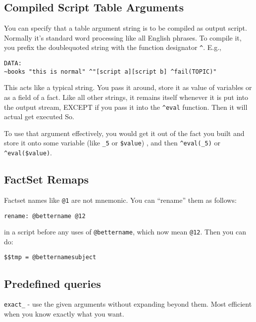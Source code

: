 \documentclass[]{article}
\begin{document}
\subsection{Compiled Script Table
Arguments}\label{compiled-script-table-arguments}

You can specify that a table argument string is to be compiled as output
script. Normally it's standard word processing like all English phrases.
To compile it, you prefix the doublequoted string with the function
designator \texttt{\^{}}. E.g.,

\begin{verbatim}
DATA:
~books "this is normal" ^"[script a][script b] ^fail(TOPIC)"
\end{verbatim}

This acts like a typical string. You pass it around, store it as value
of variables or as a field of a fact. Like all other strings, it remains
itself whenever it is put into the output stream, EXCEPT if you pass it
into the \texttt{\^{}eval} function. Then it will actual get executed
So.

To use that argument effectively, you would get it out of the fact you
built and store it onto some variable (like \texttt{\_5} or
\texttt{\$value}) , and then \texttt{\^{}eval(\_5)} or
\texttt{\^{}eval(\$value)}.

\subsection{FactSet Remaps}\label{factset-remaps}

Factset names like \texttt{@1} are not mnemonic. You can ``rename'' them
as follows:

\begin{verbatim}
rename: @bettername @12
\end{verbatim}

in a script before any uses of \texttt{@bettername}, which now mean
\texttt{@12}. Then you can do:

\begin{verbatim}
$$tmp = @betternamesubject
\end{verbatim}

\subsection{Predefined queries}\label{predefined-queries}

\texttt{exact\_} - use the given arguments without expanding beyond
them. Most efficient when you know exactly what you want.
\end{document}
